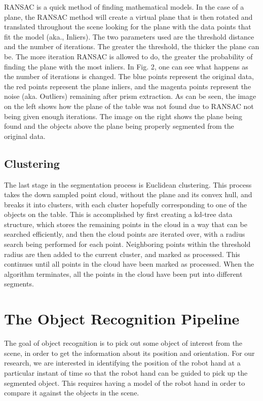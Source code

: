 \documentclass[journal]{IEEEtran}
\begin{document}
RANSAC is a quick method of finding mathematical models.  In the case of a plane, the RANSAC method will create a virtual plane that is then rotated and translated throughout the scene looking for the plane with the data points that fit the model (aka., Inliers).  The two parameters used are the threshold distance and the number of iterations.  The greater the threshold, the thicker the plane can be.  The more iteration RANSAC is allowed to do, the greater the probability of finding the plane with the most inliers.  In Fig. 2, one can see what happens as the number of iterations is changed.  The blue points represent the original data, the red points represent the plane inliers, and the magenta points represent the noise (aka. Outliers) remaining after prism extraction.  As can be seen, the image on the left shows how the plane of the table was not found due to RANSAC not being given enough iterations.  The image on the right shows the plane being found and the objects above the plane being properly segmented from the original data. 


\subsection{Clustering}
The last stage in the segmentation process is Euclidean clustering. This process takes the down sampled point cloud, without the plane and its convex hull, and breaks it into clusters, with each cluster hopefully corresponding to one of the objects on the table.  This is accomplished by first creating a kd-tree data structure, which stores the remaining points in the cloud in a way that can be searched efficiently, and then the cloud points are iterated over, with a radius search being performed for each point. Neighboring points within the threshold radius are then added to the current cluster, and marked as processed.  This continues until all points in the cloud have been marked as processed. When the algorithm terminates, all the points in the cloud have been put into different segments.



\section{The Object Recognition Pipeline}
The goal of object recognition is to pick out some object of interest from the scene, in order to get the information about its position and orientation. For our research, we are interested in identifying the position of the robot hand at a particular instant of time so that the robot hand can be guided to pick up the segmented object. This requires having a model of the robot hand in order to compare it against the objects in the scene.  
\end{document}
